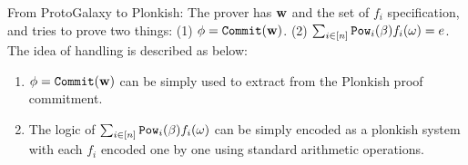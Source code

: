 From ProtoGalaxy to Plonkish: The prover has ${{\mathbf {w}}}$
and the set of $f_i$ specification, and tries to prove
two things: (1) $\phi = \texttt{Commit}({{\mathbf {w}}})$. (2)
$\sum_{i\in [n]} \texttt{Pow}_i(\beta) f_i(\omega) = e$. The idea
of handling is described as below:
\begin{enumerate}
	\item $\phi = \texttt{Commit}({{\mathbf {w}}})$ can be simply
	used to extract from the Plonkish proof commitment.
	\item The logic of $\sum_{i\in [n]} \texttt{Pow}_i(\beta) f_i(\omega)$
	can be simply encoded as a plonkish system with
	each $f_i$ encoded one by one using standard
	arithmetic operations.
\end{enumerate}



